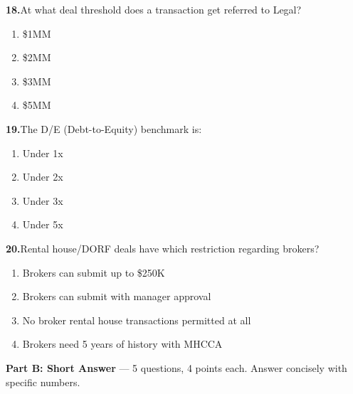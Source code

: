 \documentclass[11pt,letterpaper]{article}
\newif\ifshowsolutions
\newcommand{\answer}[1]{%
  \ifshowsolutions
    \begin{tcolorbox}[colback=green!5!white, colframe=answergreen, title={\small\textbf{Answer}}, fonttitle=\color{white}, coltitle=white, colbacktitle=answergreen, boxrule=0.5pt, arc=2pt, left=4pt, right=4pt, top=2pt, bottom=2pt]
    {\small #1}
    \end{tcolorbox}
  \fi
}
\begin{document}
\vspace{0.5em}

\noindent\textbf{18.}\quad At what deal threshold does a transaction get referred to Legal?

\begin{enumerate}[label=\Alph*), leftmargin=2em, itemsep=0pt]
\item \$1MM
\item \$2MM
\item \$3MM
\item \$5MM
\end{enumerate}
\answer{C) \$3MM. At \$1MM+, org chart and AR/AP aging are required (different threshold).}

\vspace{0.5em}

\noindent\textbf{19.}\quad The D/E (Debt-to-Equity) benchmark is:

\begin{enumerate}[label=\Alph*), leftmargin=2em, itemsep=0pt]
\item Under 1x
\item Under 2x
\item Under 3x
\item Under 5x
\end{enumerate}
\answer{C) Under 3x. SFD/EBITDA should be under 3.5x.}

\vspace{0.5em}

\noindent\textbf{20.}\quad Rental house/DORF deals have which restriction regarding brokers?

\begin{enumerate}[label=\Alph*), leftmargin=2em, itemsep=0pt]
\item Brokers can submit up to \$250K
\item Brokers can submit with manager approval
\item No broker rental house transactions permitted at all
\item Brokers need 5 years of history with MHCCA
\end{enumerate}
\answer{C) No broker rental house transactions permitted at all. Broker + rental house = automatic decline.}

\vspace{1em}
\begin{tcolorbox}[colback=blue!3!white, colframe=mhcblue, boxrule=0.5pt, arc=2pt]
\textbf{Part B: Short Answer} --- 5 questions, 4 points each. Answer concisely with specific numbers.
\end{tcolorbox}
\end{document}
